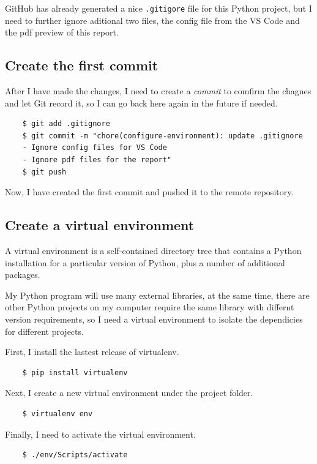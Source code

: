 \documentclass{report}
\begin{document}
GitHub has already generated a nice \texttt{.gitigore} file for this Python project, but I need to further ignore aditional two files, the config file from the VS Code and the pdf preview of this report.

\subsection{Create the first commit}

After I have made the changes, I need to create a \emph{commit} to comfirm the chagnes and let Git record it, so I can go back here again in the future if needed.

\begin{verbatim}
    $ git add .gitignore
    $ git commit -m "chore(configure-environment): update .gitignore
    - Ignore config files for VS Code
    - Ignore pdf files for the report"
    $ git push
\end{verbatim}

Now, I have created the first commit and pushed it to the remote repository.

\subsection{Create a virtual environment}

A virtual environment is a self-contained directory tree that contains a Python installation for a particular version of Python, plus a number of additional packages.

My Python program will use many external libraries, at the same time, there are other Python projects on my computer require the same library with differnt version requirements, so I need a virtual environment to isolate the dependicies for different projects.

First, I install the lastest release of virtualenv.

\begin{verbatim}
    $ pip install virtualenv
\end{verbatim}

Next, I create a new virtual environment under the project folder.

\begin{verbatim}
    $ virtualenv env
\end{verbatim}

Finally, I need to activate the virtual environment.

\begin{verbatim}
    $ ./env/Scripts/activate
\end{verbatim}
\end{document}
